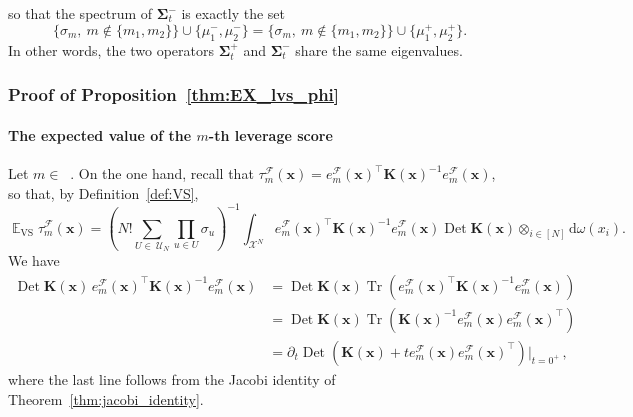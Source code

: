 \documentclass[twoside,11pt]{book}
\DeclareMathOperator{\Tr}{Tr}
\DeclareMathOperator{\Det}{Det}
\DeclareMathOperator{\VS}{\mathrm{VS}}
\DeclareMathOperator{\Tran}{\intercal}
\DeclareMathOperator{\EX}{\mathbb{E}}
\DeclareMathOperator{\F}{\mathcal{F}}
\DeclareMathOperator{\Ns}{\mathbb{N}^{*}}
\def\UN{\:\mathcal{U}_N}
\begin{document}
so that the spectrum of $\bm{\Sigma}_{t}^{-}$ is exactly the set
\begin{equation}
\{ \sigma_{m}, \: m \notin  \{m_{1},m_{2}\}\} \cup \{\mu_{1}^{-}, \mu_{2}^{-} \} = \{ \sigma_{m}, \: m \notin  \{m_{1},m_{2}\}\} \cup \{\mu_{1}^{+}, \mu_{2}^{+} \}.
\end{equation}
In other words, the two operators $\bm{\Sigma}_{t}^{+}$ and $\bm{\Sigma}_{t}^{-}$ share the same eigenvalues.


\subsubsection{Proof of Proposition~\ref{thm:EX_lvs_phi}}\label{app:proof_EX_lvs_phi}
\paragraph{The expected value of the $m$-th leverage score \label{sec:proof_EX_VS_lvs_n_diff_phi}}
Let $m \in \Ns$. On the one hand, recall that $\tau_{m}^{\F}(\bm{x}) = e_{m}^{\mathcal{F}}(\bm{x})^{\Tran}\bm{K}(\bm{x})^{-1}e_{m}^{\mathcal{F}}(\bm{x})$, so that, by Definition~\ref{def:VS},
\begin{equation}
  \label{e:just_def_of_VS}
\EX_{\VS} \tau_{m}^{\F}(\bm{x}) = \left( N!\sum\limits_{U\in\UN}\prod\limits_{u \in U}\sigma_{u} \right)^{-1} \int_{\mathcal{X}^{N}} e_{m}^{\mathcal{F}}(\bm{x})^{\Tran}\bm{K}(\bm{x})^{-1}e_{m}^{\mathcal{F}}(\bm{x}) \Det \bm{K}(\bm{x}) \otimes_{i \in [N]} \mathrm{d}\omega(x_{i}).
\end{equation}
We have
\begin{align}
\Det \bm{K}(\bm{x})\,e_{m}^{\mathcal{F}}(\bm{x})^{\Tran}\bm{K}(\bm{x})^{-1}e_{m}^{\mathcal{F}}(\bm{x}) & = \Det \bm{K}(\bm{x})\Tr \left( e_{m}^{\mathcal{F}}(\bm{x})^{\Tran}\bm{K}(\bm{x})^{-1}e_{m}^{\mathcal{F}}(\bm{x}) \right) \nonumber \\
& = \Det \bm{K}(\bm{x})\Tr \left(\bm{K}(\bm{x})^{-1}e_{m}^{\mathcal{F}}(\bm{x})e_{m}^{\mathcal{F}}(\bm{x})^{\Tran}\right)\nonumber\\
&= \partial_{t} \Det (\bm{K}(\bm{x})+t e_{m}^{\mathcal{F}}(\bm{x})e_{m}^{\mathcal{F}}(\bm{x})^{\Tran})|_{t = 0^{+}}\,,\label{e:derivative_inside_the_integral}
\end{align}
where the last line follows from the Jacobi identity of Theorem~\ref{thm:jacobi_identity}.
\end{document}

